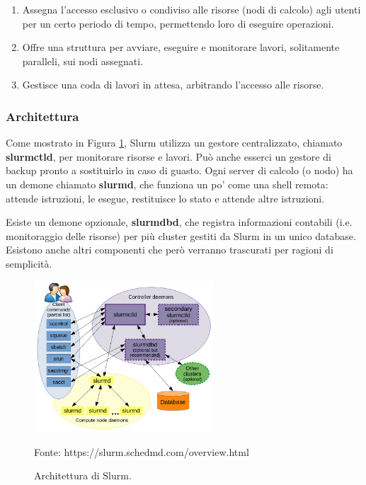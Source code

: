 \documentclass[12pt,a4paper,twoside,openright]{book}
\begin{document}
\begin{enumerate}
    \item Assegna l'accesso esclusivo o condiviso alle risorse (nodi di calcolo) agli utenti per un certo periodo di tempo, permettendo loro di eseguire operazioni.
    \item Offre una struttura per avviare, eseguire e monitorare lavori, solitamente paralleli, sui nodi assegnati.
    \item Gestisce una coda di lavori in attesa, arbitrando l'accesso alle risorse.
\end{enumerate}

\subsubsection{Architettura}
Come mostrato in Figura \ref{fig:slurm-arch}, Slurm utilizza un gestore centralizzato, chiamato \textbf{slurmctld}, per monitorare risorse e lavori. Può anche esserci un gestore di backup pronto a sostituirlo in caso di guasto. Ogni server di calcolo (o nodo) ha un demone chiamato \textbf{slurmd}, che funziona un po' come una shell remota: attende istruzioni, le esegue, restituisce lo stato e attende altre istruzioni. 

Esiste un demone opzionale, \textbf{slurmdbd}, che registra informazioni contabili (i.e. monitoraggio delle risorse) per più cluster gestiti da Slurm in un unico database. Esistono anche altri componenti che però verranno trascurati per ragioni di semplicità. 

\begin{figure}
    \centering
    \includegraphics[width=0.6\textwidth]{images/slurm-architecture.png}
    \caption{Architettura di Slurm.}
    \label{fig:slurm-arch}
    \tiny{Fonte: https://slurm.schedmd.com/overview.html}
\end{figure}
\end{document}
